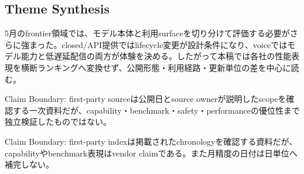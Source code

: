 \subsection{Theme Synthesis}

5月のfrontier領域では、モデル本体と利用surfaceを切り分けて評価する必要がさらに強まった。closed/API提供ではlifecycle変更が設計条件になり、voiceではモデル能力と低遅延配信の両方が体験を決める。したがって本稿では各社の性能表現を横断ランキングへ変換せず、公開形態・利用経路・更新単位の差を中心に読む。\autocite{src-01a8b52eee81,src-24a3c172de48,src-5c3d93bd7160,src-a24fd97eb3d0,src-dd5d9b8662f3,src-eac8dfbeb78c,src-f6aa679babd7}


\begin{claimboundary}
Claim Boundary: first-party sourceは公開日とsource ownerが説明したscopeを確認する一次資料だが、capability・benchmark・safety・performanceの優位性まで独立検証したものではない。\autocite{src-01a8b52eee81,src-24a3c172de48,src-5c3d93bd7160,src-a24fd97eb3d0,src-dd5d9b8662f3,src-eac8dfbeb78c,src-f6aa679babd7}
\end{claimboundary}

\begin{claimboundary}
Claim Boundary: first-party indexは掲載されたchronologyを確認する資料だが、capabilityやbenchmark表現はvendor claimである。また月精度の日付は日単位へ補完しない。\autocite{src-01a8b52eee81,src-24a3c172de48,src-5c3d93bd7160,src-a24fd97eb3d0,src-dd5d9b8662f3,src-eac8dfbeb78c,src-f6aa679babd7}
\end{claimboundary}
